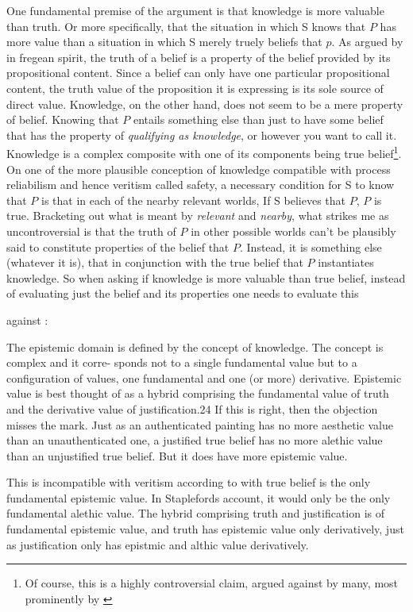 \documentclass[12pt,numbers=noenddot]{scrartcl}
\begin{document}
One fundamental premise of the argument is that knowledge is more valuable than truth. Or more specifically, that the situation in which S knows that $P$ has more value than a situation in which S merely truely beliefs that $p$. As argued by \textcite[35-38]{grundmann2008} in fregean spirit, the truth of a belief is a property of the belief provided by its propositional content. Since a belief can only have one particular propositional content, the truth value of the proposition it is expressing is its sole source of direct value. Knowledge, on the other hand, does not seem to be a mere property of belief. Knowing that $P$ entails something else than just to have some belief that has the property of \emph{qualifying as knowledge}, or however you want to call it. Knowledge is a complex composite with one of its components being true belief\footnote{Of course, this is a highly controversial claim, argued against by many, most prominently by \textcite{Williamson2000-WILKAI}}. On one of the more plausible conception of knowledge compatible with process reliabilism and hence veritism called safety, a necessary condition for S to know that $P$ is that in each of the nearby relevant worlds, If S believes that $P$, $P$ is true. Bracketing out what is meant by \emph{relevant} and \emph{nearby}, what strikes me as uncontroversial is that the truth of $P$ in other possible worlds can't be plausibly said to constitute properties of the belief that $P$. Instead, it is something else (whatever it is), that in conjunction with the true belief that $P$ instantiates knowledge. So when asking if knowledge is more valuable than true belief, instead of evaluating just the belief and its properties one needs to evaluate this

against \textcite[291]{Stapleford2016}:

The epistemic domain is defined by the concept of knowledge. The concept is complex and it corre- sponds not to a single fundamental value but to a configuration of values, one fundamental and one (or more) derivative. Epistemic value is best thought of as a hybrid comprising the fundamental value of truth and the derivative value of justification.24 If this is right, then the objection misses the mark. Just as an authenticated painting has no more aesthetic value than an unauthenticated one, a justified true belief has no more alethic value than an unjustified true belief. But it does have more epistemic value.

This is incompatible with veritism according to with true belief is the only fundamental epistemic value. In Staplefords account, it would only be the only fundamental alethic value. The hybrid comprising truth and justification is of fundamental epistemic value, and truth has epistemic value only derivatively, just as justification only has epistmic and althic value derivatively.
\end{document}

